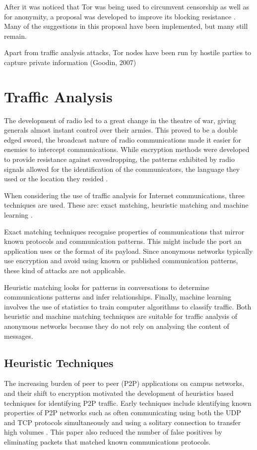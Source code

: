 \documentclass{ecuthesis}
\begin{document}
After it was noticed that Tor was being used to circumvent censorship as well as for anonymity, a proposal was developed to improve its blocking resistance \citep{Dingledine:2008p1542}. Many of the suggestions in this proposal have been implemented, but many still remain.

Apart from traffic analysis attacks, Tor nodes have been run by hostile parties to capture private information (Goodin, 2007)

\section{Traffic Analysis}

The development of radio led to a great change in the theatre of war, giving generals almost instant control over their armies. This proved to be a double edged sword, the broadcast nature of radio communications made it easier for enemies to intercept communications. While encryption methods were developed to provide resistance against eavesdropping, the patterns exhibited by radio signals allowed for the identification of the communicators, the language they used or the location they resided \cite{Kahn:1967p1005}.

When considering the use of traffic analysis for Internet communications, three  techniques are used. These are: exact matching, heuristic matching and machine learning \citep{Zhang:2009p1188}.

Exact matching techniques recognise properties of communications that mirror known protocols and communication patterns. This might include the port an application uses or the format of its payload. Since anonymous networks typically use encryption and avoid using known or published communication patterns, these kind of attacks are not applicable.

Heuristic matching looks for patterns in conversations to determine communications patterns and infer relationships. Finally, machine learning involves the use of statistics to train computer algorithms to classify traffic. Both heuristic and machine matching techniques are suitable for traffic analysis of anonymous networks because they do not rely on analysing the content of messages.

\subsection{Heuristic Techniques}

The increasing burden of peer to peer (P2P) applications on campus networks, and their shift to encryption motivated the development of heuristics based techniques for identifying P2P traffic. Early techniques include identifying known properties of P2P networks such as often communicating using both the UDP and TCP protocols simultaneously and using a solitary connection to transfer high volumes \citep{Karagiannis:2004p6400}. This paper also reduced the number of false positives by eliminating packets that matched known communications protocols.
\end{document}
